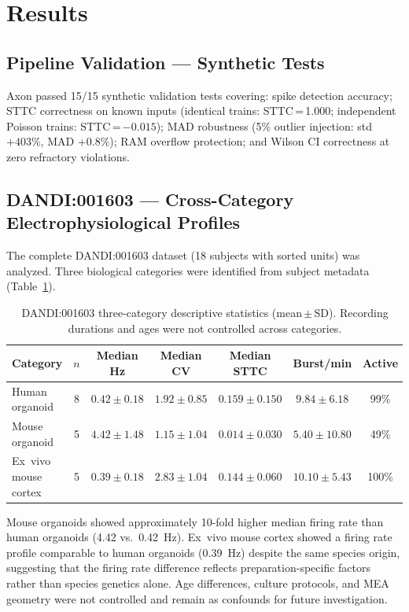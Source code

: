 \documentclass[11pt,a4paper]{article}
\begin{document}
\section{Results}

\subsection{Pipeline Validation --- Synthetic Tests}

Axon passed 15/15 synthetic validation tests covering: spike detection accuracy; 
STTC correctness on known inputs (identical trains: STTC\,=\,1.000; independent 
Poisson trains: STTC\,=\,$-0.015$); MAD robustness (5\% outlier injection: 
std $+403\%$, MAD $+0.8\%$); RAM overflow protection; and Wilson CI correctness 
at zero refractory violations.

\subsection{DANDI:001603 --- Cross-Category Electrophysiological Profiles}

The complete DANDI:001603 dataset (18 subjects with sorted units) was analyzed. 
Three biological categories were identified from subject metadata 
(Table~\ref{tab:001603}).

\begin{table}[h]
\centering
\caption{DANDI:001603 three-category descriptive statistics (mean\,$\pm$\,SD). 
Recording durations and ages were not controlled across categories.}
\label{tab:001603}
\small
\begin{tabular}{lcccccc}
\toprule
\textbf{Category} & $n$ & \textbf{Median Hz} & \textbf{Median CV} & 
\textbf{Median STTC} & \textbf{Burst/min} & \textbf{Active} \\
\midrule
Human organoid & 8 & $0.42 \pm 0.18$ & $1.92 \pm 0.85$ & 
$0.159 \pm 0.150$ & $9.84 \pm 6.18$ & 99\% \\
Mouse organoid & 5 & $4.42 \pm 1.48$ & $1.15 \pm 1.04$ & 
$0.014 \pm 0.030$ & $5.40 \pm 10.80$ & 49\% \\
Ex~vivo mouse cortex & 5 & $0.39 \pm 0.18$ & $2.83 \pm 1.04$ & 
$0.144 \pm 0.060$ & $10.10 \pm 5.43$ & 100\% \\
\bottomrule
\end{tabular}
\end{table}

Mouse organoids showed approximately 10-fold higher median firing rate than human 
organoids (4.42 vs.\ 0.42~Hz). Ex~vivo mouse cortex showed a firing rate profile 
comparable to human organoids (0.39~Hz) despite the same species origin, suggesting 
that the firing rate difference reflects preparation-specific factors rather than 
species genetics alone. Age differences, culture protocols, and MEA geometry were 
not controlled and remain as confounds for future investigation.
\end{document}

